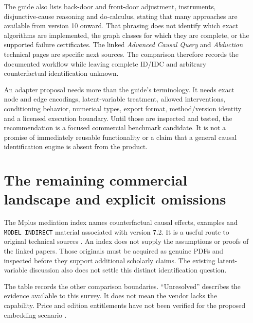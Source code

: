 The guide also lists back-door and front-door adjustment, instruments,
disjunctive-cause reasoning and do-calculus, stating that many approaches are
available from version 10 onward. That phrasing does not identify which exact
algorithms are implemented, the graph classes for which they are complete, or
the supported failure certificates. The linked \emph{Advanced Causal Query}
and \emph{Abduction} technical pages are specific next sources. The comparison
therefore records the documented workflow while leaving complete ID/IDC and
arbitrary counterfactual identification unknown.

An adapter proposal needs more than the guide's terminology. It needs exact
node and edge encodings, latent-variable treatment, allowed interventions,
conditioning behavior, numerical types, export format, method/version identity
and a licensed execution boundary. Until those are inspected and tested, the
recommendation is a focused commercial benchmark candidate. It is not a promise
of immediately reusable functionality or a claim that a general causal
identification engine is absent from the product.

\section{The remaining commercial landscape and explicit omissions}

The Mplus mediation index names counterfactual causal effects, examples and
\texttt{MODEL INDIRECT} material associated with version 7.2. It is a useful
route to original technical sources \citep{exec13_ci_mplus_mediation}. An index
does not supply the assumptions or proofs of the linked papers. Those originals
must be acquired as genuine PDFs and inspected before they support additional
scholarly claims. The existing latent-variable discussion also does not settle
this distinct identification question.

The table records the other comparison boundaries. ``Unresolved'' describes
the evidence available to this survey. It does not mean the vendor lacks the
capability. Price and edition entitlements have not been verified for the
proposed embedding scenario \citep{exec13_ci_scope}.

